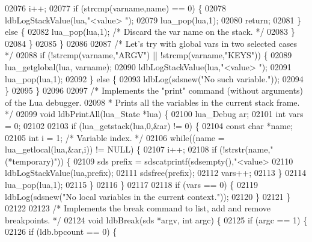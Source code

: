 \begin{DoxyCode}
{{{{{{{{{{{{{{{{{02076             i++;
02077             \textcolor{keywordflow}{if} (strcmp(varname,name) == 0) \{
02078                 ldbLogStackValue(lua,\textcolor{stringliteral}{"<value> "});
02079                 lua\_pop(lua,1);
02080                 \textcolor{keywordflow}{return};
02081             \} \textcolor{keywordflow}{else} \{
02082                 lua\_pop(lua,1); \textcolor{comment}{/* Discard the var name on the stack. */}
02083             \}
02084         \}
02085     \}
02086 
02087     \textcolor{comment}{/* Let's try with global vars in two selected cases */}
02088     \textcolor{keywordflow}{if} (!strcmp(varname,\textcolor{stringliteral}{"ARGV"}) || !strcmp(varname,\textcolor{stringliteral}{"KEYS"})) \{
02089         lua\_getglobal(lua, varname);
02090         ldbLogStackValue(lua,\textcolor{stringliteral}{"<value> "});
02091         lua\_pop(lua,1);
02092     \} \textcolor{keywordflow}{else} \{
02093         ldbLog(sdsnew(\textcolor{stringliteral}{"No such variable."}));
02094     \}
02095 \}
02096 
02097 \textcolor{comment}{/* Implements the "print" command (without arguments) of the Lua debugger.}
02098 \textcolor{comment}{ * Prints all the variables in the current stack frame. */}
02099 \textcolor{keywordtype}{void} ldbPrintAll(lua\_State *lua) \{
02100     lua\_Debug ar;
02101     \textcolor{keywordtype}{int} vars = 0;
02102 
02103     \textcolor{keywordflow}{if} (lua\_getstack(lua,0,&ar) != 0) \{
02104         \textcolor{keyword}{const} \textcolor{keywordtype}{char} *name;
02105         \textcolor{keywordtype}{int} i = 1; \textcolor{comment}{/* Variable index. */}
02106         \textcolor{keywordflow}{while}((name = lua\_getlocal(lua,&ar,i)) != NULL) \{
02107             i++;
02108             \textcolor{keywordflow}{if} (!strstr(name,\textcolor{stringliteral}{"(*temporary)"})) \{
02109                 sds prefix = sdscatprintf(sdsempty(),\textcolor{stringliteral}{"<value> %
02110                 ldbLogStackValue(lua,prefix);
02111                 sdsfree(prefix);
02112                 vars++;
02113             \}
02114             lua\_pop(lua,1);
02115         \}
02116     \}
02117 
02118     \textcolor{keywordflow}{if} (vars == 0) \{
02119         ldbLog(sdsnew(\textcolor{stringliteral}{"No local variables in the current context."}));
02120     \}
02121 \}
02122 
02123 \textcolor{comment}{/* Implements the break command to list, add and remove breakpoints. */}
02124 \textcolor{keywordtype}{void} ldbBreak(sds *argv, \textcolor{keywordtype}{int} argc) \{
02125     \textcolor{keywordflow}{if} (argc == 1) \{
02126         \textcolor{keywordflow}{if} (ldb.bpcount == 0) \{
}}}}}}}}}}}}}}}}}}
\end{DoxyCode}
